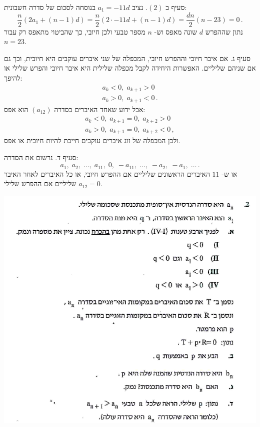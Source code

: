 \documentclass[12pt,a4paper]{article}
\begin{document}
סעיף ב
$(2)$.
נציב
$a_1=-11d$
 בנוסחה לסכום של סדרה חשבונית:
\[
\frac{n}{2}(2a_1+(n-1)d) = \frac{n}{2}(2\cdot -11d+(n-1)d) =\frac{dn}{2} (n-23)=0\,.
\]
נתון שההפרש 
$d$
שונה מאפס וש-%
$n$
מספר טבעי ולכן חיובי, כך שהביטוי מתאפס רק עבור
$n=23$.

סעיף ג. אם איבר חיובי וההפרש חיובי, המכפלה של שני איברים עוקבים היא חיובית, וכך גם אם שניהם שליליים. האפשרות היחידה לקבל מכפלה שלילית היא איבר חיובי והפרש שלילי או להיפך:
\[
\begin{array}{l}
a_k<0,\; a_{k+1}>0\\
a_k>0,\; a_{k+1}<0\,.
\end{array}
\]
אבל ידוע שאחד האיברים בסדרה 
$(a_{12})$
הוא אפס:
\[
\begin{array}{l}
a_k<0,\; a_{k+1}=0,\; a_{k+2}>0\\
a_k>0,\; a_{k+1}=0,\; a_{k+2}<0\,,
\end{array}
\]
ולכן המכפלה של זוג איברים עוקבים חייבת להיות חיובית או אפס.

סעיף ד. נרשום את הסדרה:
\[
a_1,\; a_2,\; \ldots,\; a_{11},\; 0,\; -a_{11},\; \ldots,\; -a_2,\; -a_1,\; \ldots\,.
\]
או ש-%
$11$
האיברים הראשונים שליליים אם ההפרש חיובי, או כל האיברים לאחר האיבר
$a_{12}=0$
שליליים אם ההפרש שלילי.

\newpage

\textbf{}

\begin{center}
\includegraphics[width=.95\textwidth]{summer-2018a-2}
\end{center}
\end{document}
